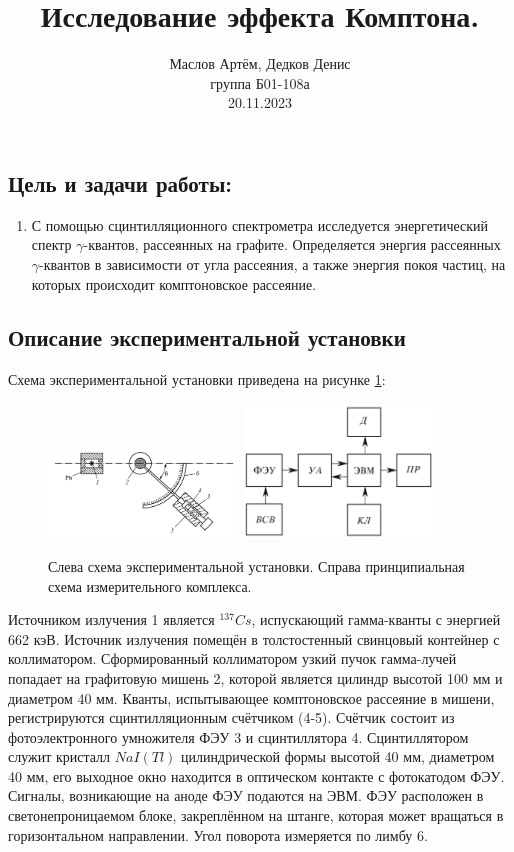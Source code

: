 \documentclass[10pt,a4paper]{article}
\author{\normalsize Маслов Артём, Дедков Денис \\
	\normalsize группа Б01-108а \\
	\normalsize 20.11.2023}
\date{}
\title{
	\Large Исследование эффекта Комптона. \\ 
}
\begin{document}
\maketitle
	
	\subsection*{Цель и задачи работы:}
	\begin{enumerate}
		\item С помощью сцинтилляционного спектрометра исследуется энергетический спектр $\gamma$-квантов, рассеянных на графите. Определяется энергия рассеянных $\gamma$-квантов в зависимости от угла рассеяния, а также энергия покоя частиц, на которых происходит комптоновское рассеяние.
	\end{enumerate}
	
	\subsection*{Описание экспериментальной установки}
	
	Схема экспериментальной установки приведена на рисунке \ref{img:exp_scheme}:
	\begin{figure}[H]
		\centering
		\includegraphics[width=0.45\textwidth]{img/exp_scheme.png}
		\includegraphics[width=0.45\textwidth]{img/prin_scheme.png}
		\caption{Слева схема экспериментальной установки. Справа принципиальная схема измерительного комплекса.}
		\label{img:exp_scheme}
	\end{figure}

	Источником излучения 1 является ${}^{137}Cs$, испускающий гамма-кванты с энергией 662 кэВ. Источник излучения помещён в толстостенный свинцовый контейнер с коллиматором. Сформированный коллиматором узкий пучок гамма-лучей попадает на графитовую мишень 2, которой является цилиндр высотой 100 мм и диаметром 40 мм. Кванты, испытывающее комптоновское рассеяние в мишени, регистрируются сцинтилляционным счётчиком (4-5). Счётчик состоит из фотоэлектронного умножителя ФЭУ 3 и сцинтиллятора 4. Сцинтиллятором служит кристалл $NaI(Tl)$ цилиндрической формы высотой 40 мм, диаметром 40 мм, его выходное окно находится в оптическом контакте с фотокатодом ФЭУ. Сигналы, возникающие на аноде ФЭУ подаются на ЭВМ. ФЭУ расположен в светонепроницаемом блоке, закреплённом на штанге, которая может вращаться в горизонтальном направлении. Угол поворота измеряется по лимбу 6.
	
\end{document}
